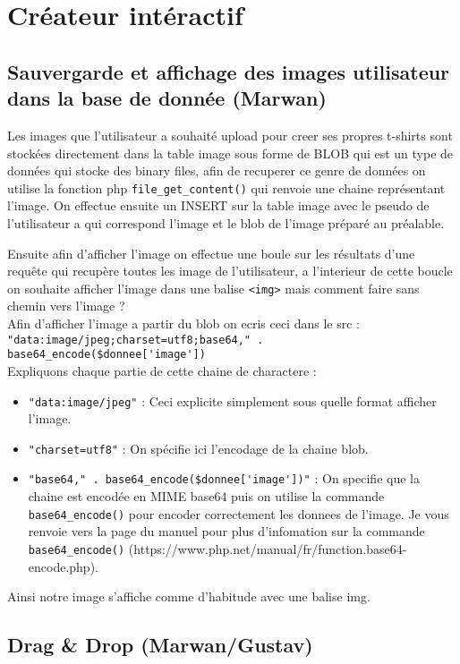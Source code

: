 \documentclass[french]{article}
\begin{document}
\section{Cr\'{e}ateur int\'{e}ractif}

\subsection{Sauvergarde et affichage des images utilisateur dans la base de donnée (Marwan)}

Les images que l'utilisateur a souhaité upload pour creer ses propres t-shirts sont stockées directement dans la table image sous forme de BLOB qui est un type de données qui stocke des binary files, afin de recuperer ce genre de données on utilise la fonction php \verb|file_get_content()| qui renvoie une chaine représentant l'image.
On effectue ensuite un INSERT sur la table image avec le pseudo de l'utilisateur a qui correspond l'image et le blob de l'image préparé au préalable. \par
Ensuite afin d'afficher l'image on effectue une boule sur les résultats d'une requête qui recupère toutes les image de l'utilisateur, a l'interieur de cette boucle on souhaite afficher l'image dans une balise \verb|<img>| mais comment faire sans chemin vers l'image ? \\
Afin d'afficher l'image a partir du blob on ecris ceci dans le src : \\ \verb|"data:image/jpeg;charset=utf8;base64," . base64_encode($donnee['image'])|\\
Expliquons chaque partie de cette chaine de charactere :
\begin{itemize}
    \item \verb|"data:image/jpeg"| : Ceci explicite simplement sous quelle format afficher l'image.
    \item \verb|"charset=utf8"| : On spécifie ici l'encodage de la chaine blob.
    \item \verb|"base64," . base64_encode($donnee['image'])"| : On specifie que la chaine est encodée en MIME base64 puis on utilise la commande \verb|base64_encode()| pour encoder correctement les donnees de l'image. Je vous renvoie vers la page du manuel pour plus d'infomation sur la commande \verb|base64_encode()| (https://www.php.net/manual/fr/function.base64-encode.php).
\end{itemize}
Ainsi notre image s'affiche comme d'habitude avec une balise img.

\subsection{Drag \& Drop (Marwan/Gustav)}
\end{document}
